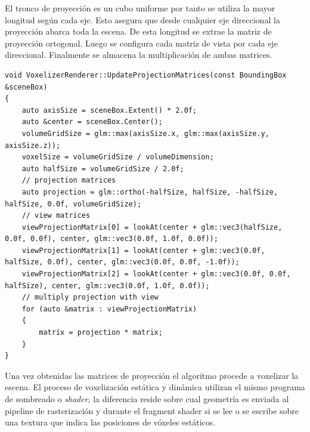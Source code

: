 El tronco de proyección es un cubo uniforme por tanto se utiliza la mayor longitud según cada eje. Esto asegura que desde cualquier eje direccional la proyección abarca toda la escena. De esta longitud se extrae la matriz de proyección ortogonal. Luego se configura cada matriz de vista por cada eje direccional. Finalmente se almacena la multiplicación de ambas matrices.
\\
\begin{lstlisting}[caption={Creación de matrices de proyección ortogonal por cada eje direccional}, label=UpdateProjectionMatrices]
void VoxelizerRenderer::UpdateProjectionMatrices(const BoundingBox &sceneBox)
{
    auto axisSize = sceneBox.Extent() * 2.0f;
    auto &center = sceneBox.Center();
    volumeGridSize = glm::max(axisSize.x, glm::max(axisSize.y, axisSize.z));
    voxelSize = volumeGridSize / volumeDimension;
    auto halfSize = volumeGridSize / 2.0f;
    // projection matrices
    auto projection = glm::ortho(-halfSize, halfSize, -halfSize, halfSize, 0.0f, volumeGridSize);
    // view matrices
    viewProjectionMatrix[0] = lookAt(center + glm::vec3(halfSize, 0.0f, 0.0f), center, glm::vec3(0.0f, 1.0f, 0.0f));
    viewProjectionMatrix[1] = lookAt(center + glm::vec3(0.0f, halfSize, 0.0f), center, glm::vec3(0.0f, 0.0f, -1.0f));
    viewProjectionMatrix[2] = lookAt(center + glm::vec3(0.0f, 0.0f, halfSize), center, glm::vec3(0.0f, 1.0f, 0.0f));
    // multiply projection with view
    for (auto &matrix : viewProjectionMatrix)
    {
        matrix = projection * matrix;
    }
}
\end{lstlisting}

Una vez obtenidas las matrices de proyección el algoritmo procede a voxelizar la escena. El proceso de voxelización estática y dinámica utilizan el mismo programa de sombreado o \emph{shader}, la diferencia reside sobre cual geometría es enviada al pipeline de rasterización y durante el fragment shader si se lee o se escribe sobre una textura que indica las posiciones de vóxeles estáticos.

